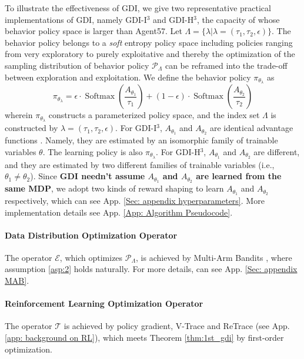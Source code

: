 \documentclass[nohyperref]{article}
\theoremstyle{plain}
\begin{document}
To illustrate the effectiveness of GDI, we give two representative practical implementations of GDI, namely GDI-I$^3$ and GDI-H$^3$, the capacity of whose behavior policy space is larger than Agent57.  Let $\Lambda = \{\lambda | \lambda = (\tau_1, \tau_2, \epsilon)\}$.
The behavior policy belongs to a \emph{soft} entropy policy space including policies ranging from very exploratory to purely exploitative and thereby the optimization of the sampling distribution  of behavior policy $\mathcal{P}_{\Lambda}$ can be reframed into the trade-off between exploration and exploitation.
We define the behavior policy $\pi_{\theta_{\lambda}}$ as
\begin{equation}
\label{equ: soft epsilon policy space}
    \pi_{\theta_{\lambda}}=\epsilon \cdot \operatorname{Softmax}\left(\frac{A_{\theta_1}}{\tau_{1}}\right)+(1-\epsilon) \cdot \operatorname{Softmax}\left(\frac{A_{\theta_2}}{\tau_{2}}\right)
\end{equation}
wherein $\pi_{\theta_{\lambda}}$ constructs a parameterized policy space, and the index set $\Lambda$ is constructed by $\lambda = (\tau_1, \tau_2, \epsilon)$.
For GDI-I$^3$, $A_{\theta_1}$ and $A_{\theta_2}$ are identical advantage functions \citep{dueling_q}. Namely, they are estimated by an isomorphic family of trainable variables $\theta$.
The learning policy is also $\pi_{\theta_{\lambda}}$.
For GDI-H$^3$,  $A_{\theta_1}$ and $A_{\theta_2}$ are different, and they are estimated by two different families of trainable variables (i.e., $\theta_1 \neq \theta_2$).
Since \textbf{GDI needn't assume $A_{\theta_1}$ and $A_{\theta_2}$ are learned from the same MDP}, we adopt two kinds of reward shaping to learn $A_{\theta_1}$ and $A_{\theta_2}$ respectively, which  can see App. \ref{Sec: appendix hyperparameters}.
More implementation details see App. \ref{App: Algorithm Pseudocode}.

\paragraph{Data Distribution Optimization Operator} The operator $\mathcal{E}$, which optimizes $\mathcal{P}_{\Lambda}$,  is achieved by Multi-Arm Bandits \citep[MAB]{sutton}, 
where assumption \eqref{asp:2} holds naturally.
For more details, can see App. \ref{Sec: appendix MAB}. 


\paragraph{Reinforcement Learning  Optimization Operator}  The operator $\mathcal{T}$ is achieved by policy gradient, V-Trace and ReTrace \citep{impala, retrace} (see App. \ref{app: background on RL}), which meets Theorem \ref{thm:1st_gdi} by first-order optimization. 
\end{document}
